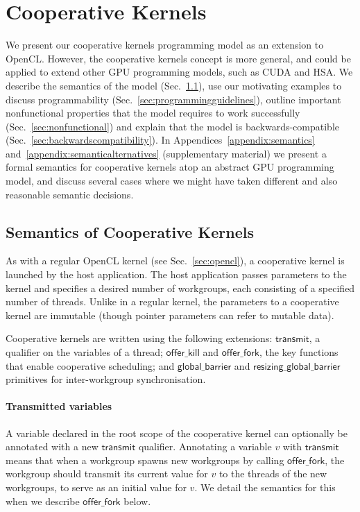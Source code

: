 \documentclass[numbers,nocopyrightspace,10pt]{sigplanconf}
\newcommand{\mysec}{Sec.~}
\newcommand{\transmit}{\mathsf{transmit}}
\newcommand{\offerfork}{\mathsf{offer\_fork}}
\newcommand{\offerkill}{\mathsf{offer\_kill}}
\newcommand{\globalbarrier}{\mathsf{global\_barrier}}
\newcommand{\resizingglobalbarrier}{\mathsf{resizing\_global\_barrier}}
\begin{document}
\section{Cooperative Kernels}\label{sec:cooperativekernels}

We present our cooperative kernels programming model as an extension
to OpenCL.  However, the cooperative kernels concept is more general,
and could be applied to extend other GPU programming models, such as
CUDA and HSA.  We describe the semantics of the model
(\mysec\ref{sec:semantics}), use our motivating examples to discuss
programmability (\mysec\ref{sec:programmingguidelines}), outline
important nonfunctional properties that the model requires to work
successfully (\mysec\ref{sec:nonfunctional}) and explain that the
model is backwards-compatible
(\mysec\ref{sec:backwardscompatibility}).
%
In Appendices~\ref{appendix:semantics} and~\ref{appendix:semanticalternatives} (supplementary material)
we present a formal semantics for cooperative kernels atop an abstract GPU programming model,
and discuss several cases where we
might have taken different and also reasonable semantic decisions.

\subsection{Semantics of Cooperative Kernels}\label{sec:semantics}

As with a regular OpenCL kernel (see \mysec\ref{sec:opencl}), a
cooperative kernel is launched by the host application.  The host
application passes parameters to the kernel and specifies a desired
number of workgroups, each consisting of a specified number of
threads.  Unlike in a regular kernel, the parameters to a cooperative kernel are immutable (though pointer
parameters can refer to mutable data).

Cooperative kernels are written using the following 
extensions: $\transmit$, a qualifier on the variables of a
thread; $\offerkill$ and $\offerfork$, the key functions that enable
cooperative scheduling; and $\globalbarrier$ and $\resizingglobalbarrier$
primitives for inter-workgroup synchronisation.

\paragraph{Transmitted variables}

A variable declared in the root scope of the cooperative kernel can
optionally be annotated with a new $\transmit$ qualifier.  Annotating
a variable $v$ with $\transmit$ means that when a workgroup spawns new
workgroups by calling $\offerfork$, the workgroup should transmit its
current value for $v$ to the threads of the new workgroups, to serve
as an initial value for $v$.  We detail the semantics for this when we
describe $\offerfork$ below.
\end{document}

